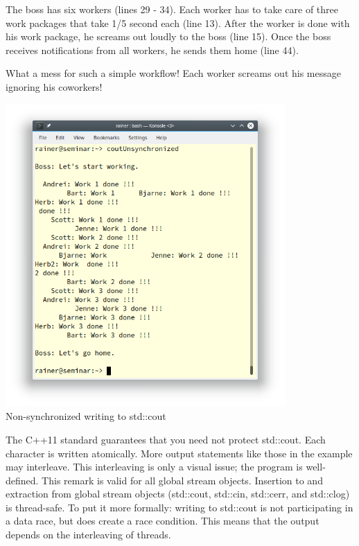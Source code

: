 The boss has six workers (lines 29 - 34). Each worker has to take care of three work packages that take 1/5 second each (line 13). After the worker is done with his work package, he screams out loudly to the boss (line 15). Once the boss receives notifications from all workers, he sends them home (line 44).

What a mess for such a simple workflow! Each worker screams out his message ignoring his coworkers!

\begin{center}
\includegraphics[width=0.8\textwidth]{content/3/chapter6/images/29.png}\\
Non-synchronized writing to std::cout
\end{center}

\begin{tcolorbox}[breakable,enhanced jigsaw,colback=blue!5!white,colframe=blue!75!black,title={std::cout is thread-safe}]
	
The C++11 standard guarantees that you need not protect std::cout. Each character is written atomically. More output statements like those in the example may interleave. This interleaving is only a visual issue; the program is well-defined. This remark is valid for all global stream objects. Insertion to and extraction from global stream objects (std::cout, std::cin, std::cerr, and std::clog) is thread-safe. To put it more formally: writing to std::cout is not participating in a data race, but does create a race condition. This means that the output depends on the interleaving of threads.
	
\end{tcolorbox}

